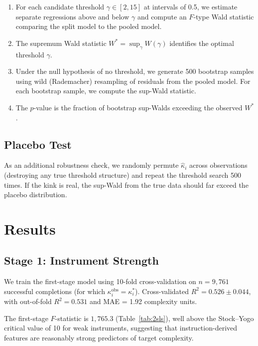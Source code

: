 \documentclass[conference]{IEEEtran}
\begin{document}
\begin{enumerate}
    \item For each candidate threshold $\gamma \in [2, 15]$ at intervals of 0.5, we estimate separate regressions above and below $\gamma$ and compute an $F$-type Wald statistic comparing the split model to the pooled model.
    \item The supremum Wald statistic $W^* = \sup_\gamma W(\gamma)$ identifies the optimal threshold $\hat{\gamma}$.
    \item Under the null hypothesis of no threshold, we generate 500 bootstrap samples using wild (Rademacher) resampling of residuals from the pooled model. For each bootstrap sample, we compute the sup-Wald statistic.
    \item The $p$-value is the fraction of bootstrap sup-Walds exceeding the observed $W^*$.
\end{enumerate}

\subsection{Placebo Test}

As an additional robustness check, we randomly permute $\hat{\kappa}_i$ across observations (destroying any true threshold structure) and repeat the threshold search 500 times. If the kink is real, the sup-Wald from the true data should far exceed the placebo distribution.

\section{Results}
\label{sec:results}

\subsection{Stage 1: Instrument Strength}

We train the first-stage model using 10-fold cross-validation on $n = 9{,}761$ successful completions (for which $\kappa_i^{\text{obs}} = \kappa_i^*$). Cross-validated $R^2 = 0.526 \pm 0.044$, with out-of-fold $R^2 = 0.531$ and MAE = 1.92 complexity units.

The first-stage $F$-statistic is $1{,}765.3$ (Table~\ref{tab:2sls}), well above the Stock--Yogo critical value of 10 for weak instruments, suggesting that instruction-derived features are reasonably strong predictors of target complexity.
\end{document}
